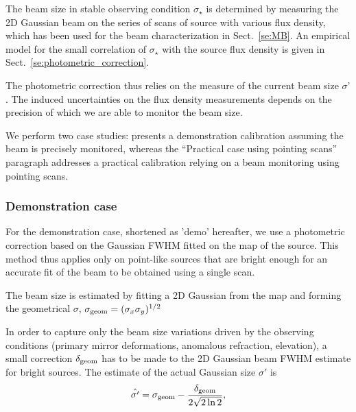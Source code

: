 The beam size in stable observing condition $\sigma_\star$ is
determined by measuring the 2D Gaussian beam on the series of scans of
source with various flux density, which has been used for the beam
characterization in Sect.~\ref{se:MB}.
An empirical model for the small correlation of
$\sigma_\star$ with the source flux density is given in
Sect.~\ref{se:photometric_correction}.

The photometric correction thus relies on the measure of the current beam
size $\sigma ’$. The induced uncertainties on the flux density
measurements depends on the precision of which we are able to monitor
the beam size. 

We perform two case studies:  presents a demonstration
calibration assuming the beam is precisely monitored, whereas
the ``Practical case using pointing scans'' paragraph addresses a practical calibration relying
on a beam monitoring using pointing scans. 

\subsubsection{Demonstration case}
\label{se:photocorr_demo}

For the demonstration case, shortened as 'demo' hereafter, we use a
photometric correction based on the Gaussian FWHM fitted on the map
of the source. This method thus applies only on point-like
sources that are bright enough for an accurate fit of the beam to be
obtained using a single scan.  

The beam size is estimated by fitting a 2D Gaussian from the map and
forming the geometrical $\sigma$,
$\sigma_{\rm{geom}} = (\sigma_x \sigma_y)^{1/2}$

In order to capture only the beam size variations driven by the
observing conditions (primary mirror deformations, anomalous
refraction, elevation), a small correction $\delta_{\rm{geom}}$ has to be made to
the 2D Gaussian beam FWHM estimate for bright sources. The estimate of the
actual Gaussian size $\sigma '$ is
\begin{equation}
  \hat{\sigma '} = \sigma_{\rm{geom}} - \frac{\delta_{\rm{geom}}}{2\sqrt{2 \ln{2}}}, 
\end{equation} 

